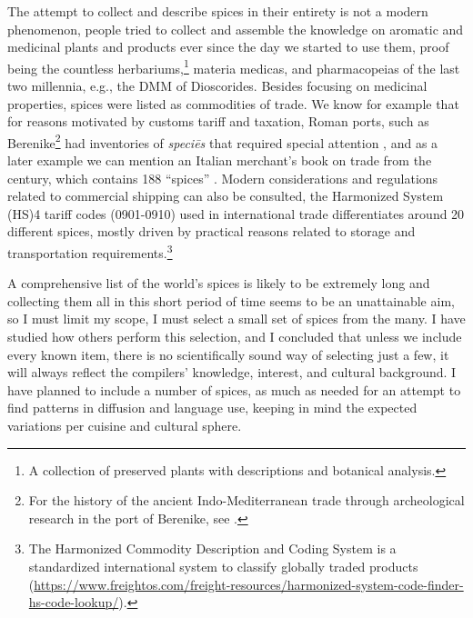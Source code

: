 The attempt to collect and describe spices in their entirety is not a modern phenomenon, people tried to collect and assemble the knowledge on aromatic and medicinal plants and products ever since the day we started to use them, proof being the countless herbariums,\footnote{A collection of preserved plants with descriptions and botanical analysis.} \glspl{materia medica}, and \glspl{pharmacopeia} of the last two millennia, e.g., the \gls{DMM} of Dioscorides. Besides focusing on medicinal properties, spices were listed as commodities of trade. We know for example that for reasons motivated by customs tariff and taxation, Roman ports, such as Berenike\footnote{For the history of the ancient Indo-Mediterranean trade through archeological research in the port of Berenike, see \textcite{sidebotham_berenike_2011}.} had inventories of \textit{speciēs} that required special attention \autocite{parthasarathi_roman_2015}, and as a later example we can mention an Italian merchant's book on trade from the  century, which contains 188 ``spices'' \autocite[411-435]{pegolotti_pratica_1936}. Modern considerations and regulations related to commercial shipping can also be consulted, the Harmonized System (HS)4 tariff codes (0901-0910) used in international trade differentiates around 20 different spices, mostly driven by practical reasons related to storage and transportation requirements.\footnote{The Harmonized Commodity Description and Coding System is a standardized international system to classify globally traded products (\url{https://www.freightos.com/freight-resources/harmonized-system-code-finder-hs-code-lookup/}).}


A comprehensive list of the world's spices is likely to be extremely long and collecting them all in this short period of time seems to be an unattainable aim, so I must limit my scope, I must select a small set of spices from the many. I have studied how others perform this selection, and I concluded that unless we include every known item, there is no scientifically sound way of selecting just a few, it will always reflect the compilers' knowledge, interest, and cultural background. I have planned to include a number of spices, as much as needed for an attempt to find patterns in diffusion and language use, keeping in mind the expected variations per cuisine and cultural sphere. 



